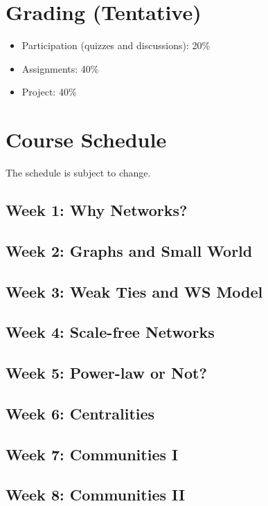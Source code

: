 \documentclass[11pt,article,oneside]{memoir}
\begin{document}
\section{Grading (Tentative)}
\label{sec:grading_tentative_}

\begin{itemize}

\item Participation (quizzes and discussions): 20\%

\item Assignments: 40\%

\item Project: 40\%


\end{itemize}

\section{Course Schedule}

The schedule is subject to change. 

\subsection{Week 1:  Why Networks?}
\subsection{Week 2:  Graphs and Small World}
\subsection{Week 3:  Weak Ties and WS Model}
\subsection{Week 4:  Scale-free Networks}
\subsection{Week 5:  Power-law or Not?}
\subsection{Week 6:  Centralities} 
\subsection{Week 7:  Communities I}
\subsection{Week 8:  Communities II}
\end{document}
